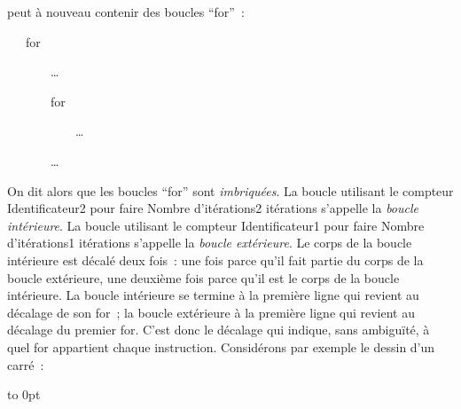 \noindent peut à nouveau contenir des boucles ``for''~:

\mbox{\blc\ \ \ {\mcl for}\hspace{0.3em}\blanc\hspace{0.3em}{\small\rm Identificateur1}\hspace{0.3em}\blanc\hspace{0.3em}{\mcl in}\hspace{0.3em}\blanc{}}\par
\mbox{\blc\ \ \ \ \ \ \ \small\rm  \ldots}\par
\mbox{\blc\ \ \ \ \ \ \ {\mcl for}\hspace{0.3em}\blanc\hspace{0.3em}{\small\rm Identificateur2}\hspace{0.3em}\blanc\hspace{0.3em}{\mcl in}\hspace{0.3em}\blanc{}}\par
\mbox{\blc\ \ \ \ \ \ \ \ \ \ \ \small\rm  \ldots}\par
\mbox{\blc\ \ \ \ \ \ \ \small\rm  \ldots}\par

\noindent On dit alors que les  boucles ``for'' sont {\em imbriquées}.
La boucle utilisant le
compteur {\small\rm Identificateur2} pour faire
{\small\rm Nombre d'itérations2} itérations s'appelle la
 {\em boucle intérieure}. La boucle utilisant le compteur {\small\rm Identificateur1} pour faire
{\small\rm Nombre d'itérations1} itérations s'appelle la {\em boucle extérieure}.
Le corps de la boucle intérieure est décalé deux fois~: une fois parce qu'il fait partie
du corps de la boucle extérieure, une deuxième fois parce qu'il est le corps de la boucle
intérieure. La boucle intérieure se termine à la première ligne qui revient au décalage
de son {\mcl for}~; la boucle extérieure à la première ligne qui revient au décalage du
premier {\mcl for}. C'est donc le décalage qui indique, sans ambiguïté, à quel {\mcl for}
appartient chaque instruction. Considérons par exemple
le dessin d'un carré~:
\par\noindent\begin{minipage}{\linewidth}
\vbox to 0pt{}%

\end{minipage}

